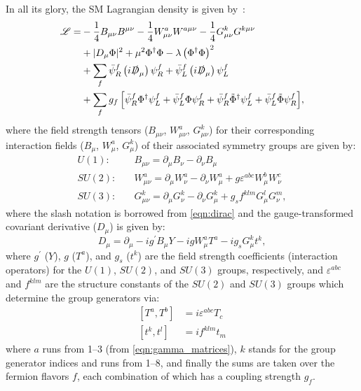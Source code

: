 In all its glory, the SM Lagrangian density is given by~\cite{Halzen:1984mc, thesis_xunwu}:
\begin{align*}
    \mathscr{L} =
    & - \frac{1}{4} B_{\mu \nu} B^{\mu \nu} - \frac{1}{4} W^a_{\mu \nu} W^{a \mu \nu} - \frac{1}{4} G^k_{\mu \nu} G^{k \mu \nu}
    \\
    & + \lvert D_\mu\Phi \rvert^2 + \mu^2 \Phi^\dagger \Phi - \lambda \left( \Phi^\dagger \Phi \right)^2
    \\
    & + \sum_f{
            \bar{\psi}^f_R \left(i {\slashed D_\mu}\right) \psi_R^f + \bar{\psi}^f_L \left(i {\slashed D_\mu}\right) \psi_L^f
        }
    \\
    & + \sum_f{
            g_f \left[ \bar{\psi}_R^f \Phi^\dagger \psi_L^f + \bar{\psi}_L^f \Phi \psi_R^f + \bar{\psi}_R^f \tilde{\Phi}^\dagger \psi_L^f + \bar{\psi}_L^f \tilde{\Phi} \psi_R^f \right]
        },
\end{align*}
where the field strength tensors ($B_{\mu \nu}$, $W_{\mu \nu}^a$, $G_{\mu \nu}^k$) for their corresponding interaction fields
($B_\mu$, $W_\mu^a$, $G_\mu^k$)
of their associated symmetry groups are given by:
\begin{align*}
    U(1) : \quad & B_{\mu \nu}    = \partial_\mu B_\nu - \partial_\nu B_\mu
    \\
    SU(2) : \quad & W_{\mu \nu}^a  = \partial_\mu W_\nu^a - \partial_\nu W_\mu^a + g \varepsilon^{abc} W_\mu^b W_\nu^c
    \\
    SU(3) : \quad & G_{\mu \nu}^k  = \partial_\mu G_\nu^k - \partial_\nu G_\mu^k + g_s f^{klm} G_\mu^l G_\nu^m,
\end{align*}
where the slash notation is borrowed from \cref{eqn:dirac} and the gauge-transformed covariant derivative ($D_\mu$) is given by:
\begin{equation*}
    D_\mu = \partial_\mu - i g^\prime B_\mu Y - i g W_\mu^a T^a - i g_s G_\mu^k t^k,
\end{equation*}
where $g^\prime$ ($Y$), $g$ ($T^a$), and $g_s$ ($t^k$) are the field strength coefficients (interaction operators) for the $U(1)$, $SU(2)$, and $SU(3)$ groups, respectively,
and $\varepsilon^{abc}$ and $f^{klm}$ are the structure constants of the $SU(2)$ and $SU(3)$ groups which determine the group generators via:
\begin{align*}
     \left[ T^a, T^b \right] &= i \varepsilon^{abc} T_c
     \\
     \left[ t^k, t^l \right] &= i f^{klm} t_m
\end{align*}
where $a$ runs from 1--3 (from \cref{eqn:gamma_matrices}),
$k$ stands for the group generator indices and runs from 1--8,
and finally the sums are taken over the fermion flavors $f$, each combination of which has a coupling strength $g_f$.

